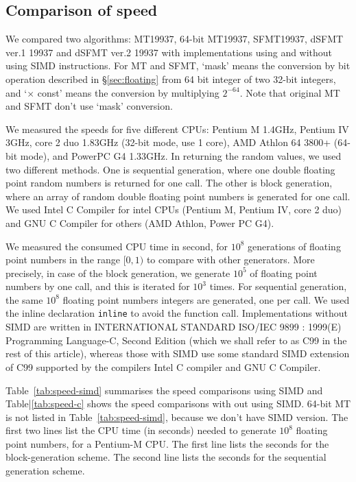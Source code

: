 \documentclass{svmult}
\begin{document}
\subsection{Comparison of speed}\label{sec:comp-speed}
We compared two algorithms: MT19937, 64-bit MT19937, SFMT19937, dSFMT
ver.1 19937 and dSFMT ver.2 19937 with implementations using and
without using SIMD instructions. For MT and SFMT, `mask' means the
conversion by bit operation described in \S\ref{sec:floating} from 64
bit integer of two 32-bit integers, and `$\times$ const' means the
conversion by multiplying $2^{-64}$. Note that original MT and SFMT
don't use `mask' conversion.

We measured the speeds for five different CPUs: Pentium M 1.4GHz,
Pentium IV 3GHz, core 2 duo 1.83GHz (32-bit mode, use 1 core), AMD
Athlon 64 3800+ (64-bit mode), and PowerPC G4 1.33GHz.  In returning
the random values, we used two different methods.  One is sequential
generation, where one double floating point random numbers is returned
for one call.  The other is block generation, where an array of random
double floating point numbers is generated for one call.  We used
Intel C Compiler for intel CPUs (Pentium M, Pentium IV, core 2 duo)
and GNU C Compiler for others (AMD Athlon, Power PC G4).

We measured the consumed CPU time in second, for $10^8$ generations of
floating point numbers in the range $[0, 1)$ to compare with other
generators.  More precisely, in case of the block generation, we
generate $10^5$ of floating point numbers by one call, and this is
iterated for $10^3$ times.  For sequential generation, the same $10^8$
floating point numbers integers are generated, one per call.  We used
the inline declaration {\tt inline} to avoid the function call.
Implementations without SIMD are written in INTERNATIONAL STANDARD
ISO/IEC 9899 : 1999(E) Programming Language-C, Second Edition (which
we shall refer to as C99 in the rest of this article), whereas those
with SIMD use some standard SIMD extension of C99 supported by the
compilers Intel C compiler and GNU C Compiler.

Table~\ref{tab:speed-simd} summarises the speed comparisons using SIMD
and Table|\ref{tab:speed-c} shows the speed comparisons with out using
SIMD.  64-bit MT is not listed in Table~\ref{tab:speed-simd}, because
we don't have SIMD version.  The first two lines list the CPU time (in
seconds) needed to generate $10^8$ floating point numbers, for a
Pentium-M CPU.  The first line lists the seconds for the
block-generation scheme.  The second line lists the seconds for the
sequential generation scheme. 
\end{document}
